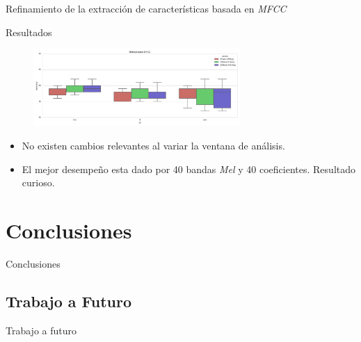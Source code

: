 \documentclass[aspectratio=169]{beamer}
\begin{document}
\begin{frame}{Refinamiento de la extracción de características basada en \textit{MFCC}}
\begin{block}{Resultados}
\begin{figure}[H]
\begin{center}
\includegraphics[width=0.7\textwidth]{exp3_refinamiento} 
\end{center}
\end{figure}
\end{block}
\begin{itemize}
\item No existen cambios relevantes al variar la ventana de análisis.
\item \alert{El mejor desempeño esta dado por 40 bandas \textit{Mel} y 40 coeficientes.} Resultado curioso.
\end{itemize}
\end{frame}


\section{Conclusiones}

\begin{frame}{Conclusiones}

\end{frame}

\subsection{Trabajo a Futuro}

\begin{frame}{Trabajo a futuro}
\end{frame}
\end{document}
